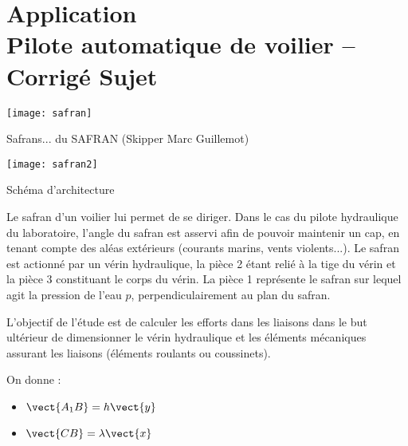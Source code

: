 \chapter*{Application  \\ 
Pilote automatique de voilier -- \ifprof Corrigé \else Sujet \fi}

\iflivret {} \else
\ifprof  {} \else \fi
\fi

\setcounter{question}{0}

\begin{marginfigure}[4cm]
\texttt{[image: safran]}

\caption{Safrans... du SAFRAN (Skipper Marc Guillemot)}
\end{marginfigure}

\begin{marginfigure}[9cm]
\texttt{[image: safran2]}

\caption{Schéma d'architecture}
\end{marginfigure}




Le safran d'un voilier lui permet de se diriger. Dans le cas du pilote hydraulique du laboratoire, l'angle du safran est asservi afin de pouvoir maintenir un cap, en tenant compte des aléas extérieurs (courants marins, vents violents...). Le safran est actionné par un vérin hydraulique, la pièce 2 étant relié à la tige du vérin et la pièce 3 constituant le corps du vérin. La pièce 1 représente le safran sur lequel agit la pression de l'eau $p$, perpendiculairement au plan du safran. 

L'objectif de l'étude est de calculer les efforts dans les liaisons dans le but ultérieur de dimensionner le vérin hydraulique et les éléments mécaniques assurant les liaisons (éléments roulants ou coussinets). 





On donne : 
\begin{itemize}
\item $\vect{A_1B}=h\vect{y}$
\item $\vect{CB}=\lambda\vect{x}$
\end{itemize}

